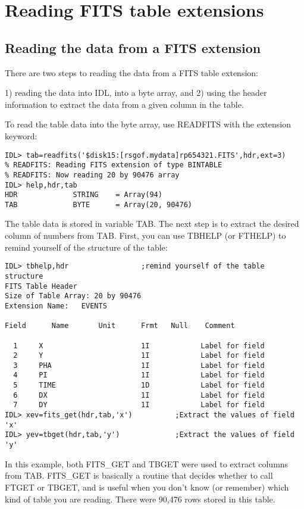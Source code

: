 \section{Reading FITS table extensions}
 

\subsection{Reading the data from a FITS extension}
 
There are two steps to reading the data from a FITS table extension:
 
1) reading the data into IDL, into a byte array, and 2) using the header
information to extract the data from a given column in the table.
 
To read the table data into the byte array, use READFITS with the extension
keyword:

\medskip\noindent
\begin{verbatim}
IDL> tab=readfits('$disk15:[rsgof.mydata]rp654321.FITS',hdr,ext=3)
% READFITS: Reading FITS extension of type BINTABLE
% READFITS: Now reading 20 by 90476 array
IDL> help,hdr,tab			
HDR             STRING    = Array(94)
TAB             BYTE      = Array(20, 90476)
\end{verbatim}
The table data is stored in variable TAB. The next step is to extract the
desired column of numbers from TAB. First, you can use TBHELP (or FTHELP) to
remind yourself of the structure of the table:

\medskip\noindent
\begin{verbatim}
IDL> tbhelp,hdr                 ;remind yourself of the table structure
FITS Table Header
Size of Table Array: 20 by 90476
Extension Name:   EVENTS
 
Field      Name       Unit      Frmt   Null    Comment
 
  1     X                       1I            Label for field
  2     Y                       1I            Label for field
  3     PHA                     1I            Label for field
  4     PI                      1I            Label for field
  5     TIME                    1D            Label for field
  6     DX                      1I            Label for field
  7     DY                      1I            Label for field
IDL> xev=fits_get(hdr,tab,'x')          ;Extract the values of field 'x'
IDL> yev=tbget(hdr,tab,'y')             ;Extract the values of field 'y'
\end{verbatim}
In this example, both FITS{\_}GET and TBGET were used to extract columns from TAB.
FITS{\_}GET is basically a routine that decides whether to call FTGET or TBGET,
and is useful when you don't know (or remember) which kind of table you are
reading. There were 90,476 rows stored in this table.
 
